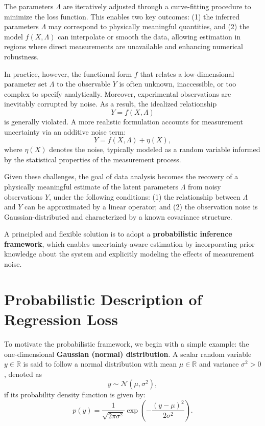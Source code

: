 \documentclass[12pt]{article}
\begin{document}
The parameters \( \Lambda \) are iteratively adjusted through a curve-fitting procedure to minimize the loss function. This enables two key outcomes: (1) the inferred parameters \( \Lambda \) may correspond to physically meaningful quantities, and (2) the model \( f(X, \Lambda) \) can interpolate or smooth the data, allowing estimation in regions where direct measurements are unavailable and enhancing numerical robustness.

In practice, however, the functional form \( f \) that relates a low-dimensional parameter set \( \Lambda \) to the observable \( Y \) is often unknown, inaccessible, or too complex to specify analytically. Moreover, experimental observations are inevitably corrupted by noise. As a result, the idealized relationship
\begin{equation}
    Y = f(X, \Lambda)
\end{equation}
is generally violated. A more realistic formulation accounts for measurement uncertainty via an additive noise term:
\begin{equation}
    Y = f(X, \Lambda) + \eta(X),
    \label{eq:noisy_fit}
\end{equation}
where \( \eta(X) \) denotes the noise, typically modeled as a random variable informed by the statistical properties of the measurement process.

Given these challenges, the goal of data analysis becomes the recovery of a physically meaningful estimate of the latent parameters \( \Lambda \) from noisy observations \( Y \), under the following conditions:  
(1) the relationship between \( \Lambda \) and \( Y \) can be approximated by a linear operator; and  
(2) the observation noise is Gaussian-distributed and characterized by a known covariance structure.  

A principled and flexible solution is to adopt a \textbf{probabilistic inference framework}, which enables uncertainty-aware estimation by incorporating prior knowledge about the system and explicitly modeling the effects of measurement noise.

\section{Probabilistic Description of Regression Loss}
To motivate the probabilistic framework, we begin with a simple example: the one-dimensional \textbf{Gaussian (normal) distribution}. A scalar random variable \( y \in \mathbb{R} \) is said to follow a normal distribution with mean \( \mu \in \mathbb{R} \) and variance \( \sigma^2 > 0 \), denoted as
\begin{equation}
    y \sim \mathcal{N}(\mu, \sigma^2),
\end{equation}
if its probability density function is given by:
\begin{equation}
    p(y) = \frac{1}{\sqrt{2\pi\sigma^2}} \exp\left( -\frac{(y - \mu)^2}{2\sigma^2} \right).
\end{equation}
\end{document}
